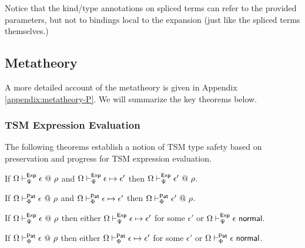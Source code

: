 Notice that the kind/type annotations on spliced terms can refer to the provided parameters, but not to bindings local to the expansion (just like the spliced terms themselves.)

\subsection{Metatheory}
A more detailed account of the metatheory is given in Appendix \ref{appendix:metatheory-P}. We will summarize the key theorems below.

\subsubsection{TSM Expression Evaluation}
The following theorems establish a notion of TSM type safety based on preservation and progress for TSM expression evaluation.

\begingroup
\def\thetheorem{\ref{thm:peTSM-preservation}}
\begin{theorem}
If $\Omega \vdash_{\Psi}^{\mathsf{Exp}} \epsilon ~@~ \rho$ and $\Omega \vdash_{\Psi}^\mathsf{Exp} \epsilon \mapsto \epsilon'$ then $\Omega \vdash_{\Psi}^{\mathsf{Exp}} \epsilon' ~@~ \rho$.
\end{theorem}
\endgroup

\begingroup
\def\thetheorem{\ref{thm:ppTSM-preservation}}
\begin{theorem}
If $\Omega \vdash_{\Phi}^{\mathsf{Pat}} \epsilon ~@~ \rho$ and $\Omega \vdash_{\Phi}^\mathsf{Pat} \epsilon \mapsto \epsilon'$ then $\Omega \vdash_{\Phi}^{\mathsf{Pat}} \epsilon' ~@~ \rho$.
\end{theorem}
\endgroup

\begingroup
\def\thetheorem{\ref{thm:peTSM-progress}}
\begin{theorem}
If $\Omega \vdash_{\Psi}^{\mathsf{Exp}} \epsilon ~@~ \rho$ then either $\Omega \vdash_{\Psi}^\mathsf{Exp} \epsilon \mapsto \epsilon'$ for some $\epsilon'$ or $\Omega \vdash_{\Psi}^\mathsf{Exp} \epsilon~\mathsf{normal}$.
\end{theorem}
\endgroup

\begingroup
\def\thetheorem{\ref{thm:ppTSM-progress}}
\begin{theorem}
If $\Omega \vdash_{\Phi}^{\mathsf{Pat}} \epsilon ~@~ \rho$ then either $\Omega \vdash_{\Phi}^\mathsf{Pat} \epsilon \mapsto \epsilon'$ for some $\epsilon'$ or $\Omega \vdash_{\Phi}^\mathsf{Pat} \epsilon~\mathsf{normal}$.
\end{theorem}
\endgroup

